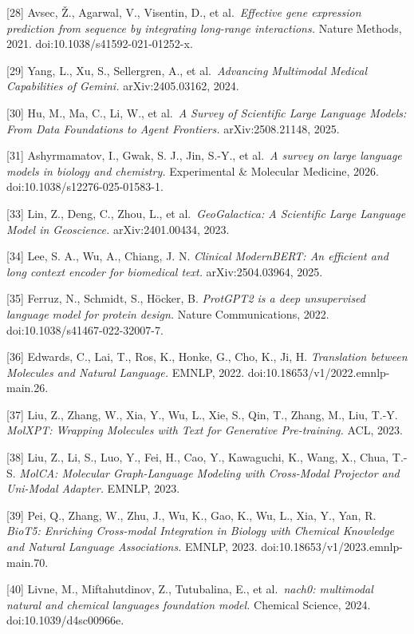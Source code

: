 {[}28{]} Avsec, Ž., Agarwal, V., Visentin, D., et al.~\emph{Effective gene expression prediction from sequence by integrating long-range interactions.} Nature Methods, 2021. doi:10.1038/s41592-021-01252-x.

{[}29{]} Yang, L., Xu, S., Sellergren, A., et al.~\emph{Advancing Multimodal Medical Capabilities of Gemini.} arXiv:2405.03162, 2024.

{[}30{]} Hu, M., Ma, C., Li, W., et al.~\emph{A Survey of Scientific Large Language Models: From Data Foundations to Agent Frontiers.} arXiv:2508.21148, 2025.

{[}31{]} Ashyrmamatov, I., Gwak, S. J., Jin, S.-Y., et al.~\emph{A survey on large language models in biology and chemistry.} Experimental \& Molecular Medicine, 2026. doi:10.1038/s12276-025-01583-1.

{[}33{]} Lin, Z., Deng, C., Zhou, L., et al.~\emph{GeoGalactica: A Scientific Large Language Model in Geoscience.} arXiv:2401.00434, 2023.

{[}34{]} Lee, S. A., Wu, A., Chiang, J. N. \emph{Clinical ModernBERT: An efficient and long context encoder for biomedical text.} arXiv:2504.03964, 2025.

{[}35{]} Ferruz, N., Schmidt, S., Höcker, B. \emph{ProtGPT2 is a deep unsupervised language model for protein design.} Nature Communications, 2022. doi:10.1038/s41467-022-32007-7.

{[}36{]} Edwards, C., Lai, T., Ros, K., Honke, G., Cho, K., Ji, H. \emph{Translation between Molecules and Natural Language.} EMNLP, 2022. doi:10.18653/v1/2022.emnlp-main.26.

{[}37{]} Liu, Z., Zhang, W., Xia, Y., Wu, L., Xie, S., Qin, T., Zhang, M., Liu, T.-Y. \emph{MolXPT: Wrapping Molecules with Text for Generative Pre-training.} ACL, 2023.

{[}38{]} Liu, Z., Li, S., Luo, Y., Fei, H., Cao, Y., Kawaguchi, K., Wang, X., Chua, T.-S. \emph{MolCA: Molecular Graph-Language Modeling with Cross-Modal Projector and Uni-Modal Adapter.} EMNLP, 2023.

{[}39{]} Pei, Q., Zhang, W., Zhu, J., Wu, K., Gao, K., Wu, L., Xia, Y., Yan, R. \emph{BioT5: Enriching Cross-modal Integration in Biology with Chemical Knowledge and Natural Language Associations.} EMNLP, 2023. doi:10.18653/v1/2023.emnlp-main.70.

{[}40{]} Livne, M., Miftahutdinov, Z., Tutubalina, E., et al.~\emph{nach0: multimodal natural and chemical languages foundation model.} Chemical Science, 2024. doi:10.1039/d4sc00966e.

